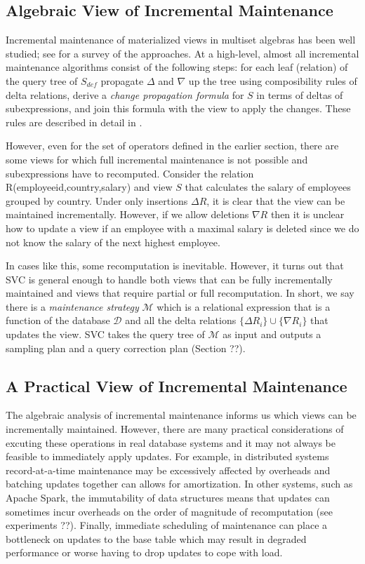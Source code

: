 \subsection{Algebraic View of Incremental Maintenance}\label{subsec-inc}
Incremental maintenance of materialized views in multiset algebras has been well studied; see \cite{chirkova2011materialized} for a survey of the approaches. 
At a high-level, almost all incremental maintenance algorithms consist of the following steps: for each leaf (relation) of the query tree of $S_{def}$ propagate $\Delta$ and $\nabla$ up the tree using composibility rules of delta relations, derive a \emph{change propagation formula} for $S$ in terms of deltas of subexpressions, and join this formula with the view to apply the changes. 
These rules are described in detail in \cite{DBLP:journals/vldb/KochAKNNLS14, DBLP:conf/pods/Koch10}.

However, even for the set of operators defined in the earlier section, there are some views for which full incremental maintenance is not possible and subexpressions have to recomputed. Consider the relation R(employeeid,country,salary) and view $S$ that calculates the \maxfunc salary of employees grouped by country. Under only insertions $\Delta R$, it is clear that the view can be maintained incrementally. 
However, if we allow deletions $\nabla R$ then it is unclear how to update a view if an employee with a maximal salary is deleted since we do not know the salary of the next highest employee. 

In cases like this, some recomputation is inevitable.
However, it turns out that SVC is general enough to handle both views that can be fully incrementally maintained and views that require partial or full recomputation.
In short, we say there is a \emph{maintenance strategy} $\mathcal{M}$ which is a relational expression that is a function of the database $\mathcal{D}$ and all the delta relations $\{\Delta R_i\} \cup \{\nabla R_i\}$ that updates the view.
SVC takes the query tree of $\mathcal{M}$ as input and outputs a sampling plan and a query correction plan (Section ??).

\subsection{A Practical View of Incremental Maintenance}
The algebraic analysis of incremental maintenance informs us which views can be incrementally maintained.
However, there are many practical considerations of excuting these operations in real database systems and it may not always be feasible to immediately apply updates.
For example, in distributed systems record-at-a-time maintenance may be excessively affected by overheads and batching updates together can allows for amortization.
In other systems, such as Apache Spark, the immutability of data structures means that updates can sometimes incur overheads on the order of magnitude of recomputation (see experiments ??).
Finally, immediate scheduling of maintenance can place a bottleneck on updates to the base table which may result in degraded performance or worse having to drop updates to cope with load.

